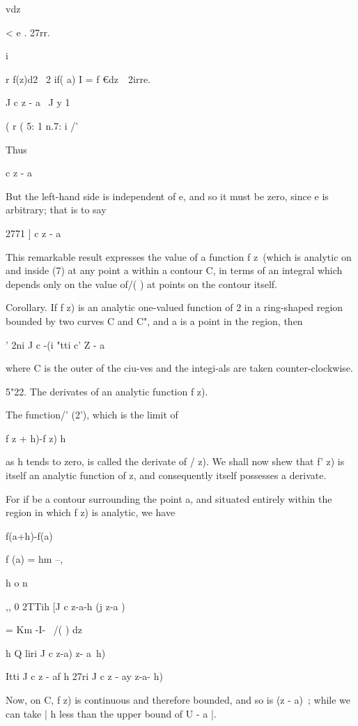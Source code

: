 {{vdz

< e . 27rr.

i

%
%

r f(z)d2 \ 2 if( a) I = f €dz\ \ 2irre.

J c z - a \ J y 1

( r ( 5: 1 n.7: i /'

Thus

c z - a

But the left-hand side is independent of e, and so it must be zero,
since e is arbitrary; that is to say

    2771 ] c z - a

This remarkable result expresses the value of a function f z\ (which
is analytic on and inside (7) at any point a within a contour C, in
terms of an integral which depends only on the value of/( ) at points
on the contour itself.

Corollary. If f z) is an analytic one-valued function of 2 in a
ring-shaped region bounded by two curves C and C", and a is a point in
the region, then

' 2ni J c -(i "tti c' Z - a

where C is the outer of the ciu-ves and the integi-als are taken
counter-clockwise.

5"22. The derivates of an analytic function f z).

The function/' (2'), which is the limit of

f z + h)-f z) h

as h tends to zero, is called the derivate of / z). We shall now shew
that f' z) is itself an analytic function of z, and consequently
itself possesses a derivate.

For if be a contour surrounding the point a, and situated entirely
within the region in which f z) is analytic, we have

f(a+h)-f(a)

f (a) = hm --,

h o n

,, 0 2TTih [J c z-a-h (j z-a )

= Km -I- \ /( ) dz

h Q liri J c z-a) z- a~h)

Itti J c z - af h 27ri J c z - ay z-a- h)

Now, on C, f z) is continuous and therefore bounded, and so is (z -
a)~; while we can take | h less than the upper bound of U - a |.

\

}}
